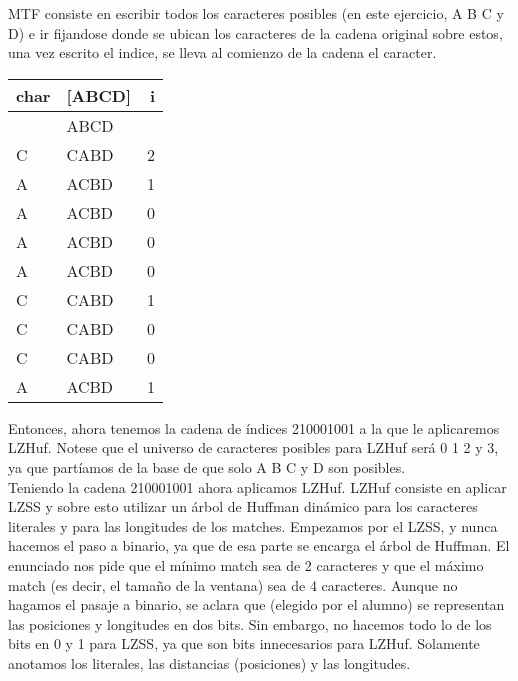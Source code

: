 \documentclass[a4paper]{article}
\begin{document}
    MTF consiste en escribir todos los caracteres posibles (en este ejercicio, A B C y D) e ir fijandose donde se ubican los caracteres de la cadena original sobre estos, una vez escrito el indice, se lleva al comienzo de la cadena el caracter.
    
    \begin{table}[H]
        \begin{tabular}{|l|l|r|}
        \hline
        char & {[}ABCD{]} & i \\
        \hline
             & ABCD       &   \\
        \hline
        C    & CABD       & 2 \\
        A    & ACBD       & 1 \\
        A    & ACBD       & 0 \\
        A    & ACBD       & 0 \\
        A    & ACBD       & 0 \\
        C    & CABD       & 1 \\
        C    & CABD       & 0 \\
        C    & CABD       & 0 \\
        A    & ACBD       & 1 \\
        \hline
        \end{tabular}
    \end{table}

    Entonces, ahora tenemos la cadena de índices 210001001 a la que le aplicaremos LZHuf. Notese que el universo de caracteres posibles para LZHuf será  0 1 2 y 3, ya que partíamos de la base de que solo A B C y D son posibles. \\

    Teniendo la cadena 210001001 ahora aplicamos LZHuf. LZHuf consiste en aplicar LZSS y sobre esto utilizar un árbol de Huffman dinámico para los caracteres literales y para las longitudes de los matches. Empezamos por el LZSS, y nunca hacemos el paso a binario, ya que de esa parte se encarga el árbol de Huffman. El enunciado nos pide que el mínimo match sea de 2 caracteres y que el máximo match (es decir, el tamaño de la ventana) sea de 4 caracteres. Aunque no hagamos el pasaje a binario, se aclara que (elegido por el alumno) se representan las posiciones y longitudes en dos bits. Sin embargo, no hacemos todo lo de los bits en 0 y 1 para LZSS, ya que son bits innecesarios para LZHuf. Solamente anotamos los literales, las distancias (posiciones) y las longitudes.
\end{document}
